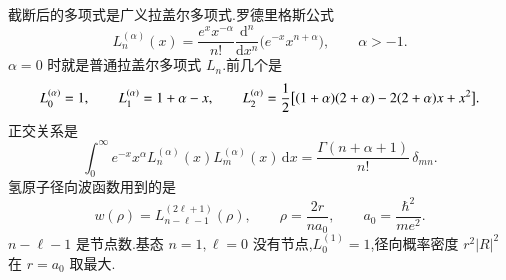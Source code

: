 截断后的多项式是广义拉盖尔多项式.罗德里格斯公式
\begin{equation}
  L_n^{(\alpha)}(x)
  =\frac{e^{x} x^{-\alpha}}{n!}
    \frac{\mathrm{d}^n}{\mathrm{d}x^n}\bigl(e^{-x} x^{n+\alpha}\bigr),
  \qquad \alpha>-1.
\end{equation}
$\alpha=0$ 时就是普通拉盖尔多项式 $L_n$.前几个是
\begin{equation}
  L_0^{(\alpha)}=1,
  \qquad
  L_1^{(\alpha)}=1+\alpha-x,
  \qquad
  L_2^{(\alpha)}={\frac{1}{2}}\bigl[(1+\alpha)(2+\alpha)-2(2+\alpha)x+x^2\bigr].
\end{equation}
正交关系是
\begin{equation}
  \int_0^{\infty} e^{-x} x^{\alpha} L_n^{(\alpha)}(x) L_m^{(\alpha)}(x)\,\mathrm{d}x
  =\frac{\Gamma(n+\alpha+1)}{n!}\,\delta_{mn}.
\end{equation}
氢原子径向波函数用到的是
\begin{equation}
  w(\rho)=L_{n-\ell-1}^{(2\ell+1)}(\rho),
  \qquad
  \rho=\frac{2r}{n a_0},
  \qquad
  a_0=\frac{\hbar^2}{m e^2}.
\end{equation}
$n-\ell-1$ 是节点数.基态 $n=1,\ell=0$ 没有节点,$L_0^{(1)}=1$,径向概率密度 $r^2|R|^2$ 在 $r=a_0$ 取最大.
